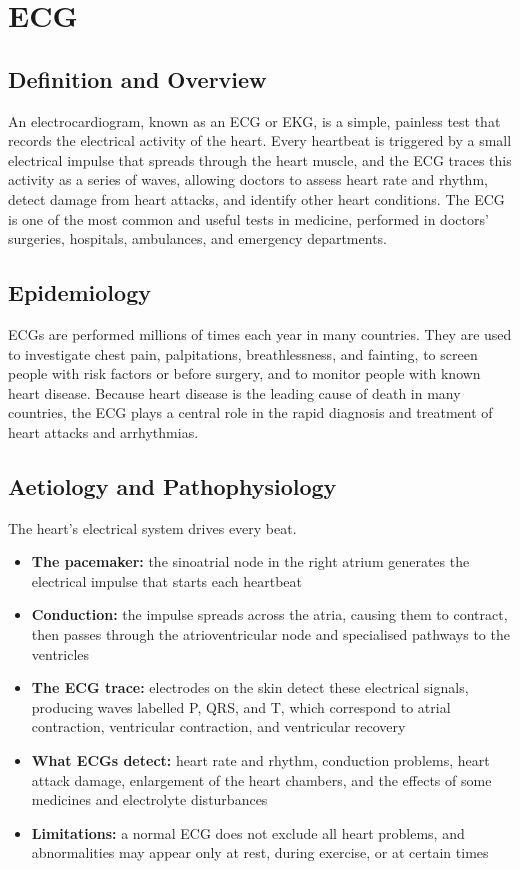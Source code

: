 \chapter{ECG}

\section*{Definition and Overview}
An electrocardiogram, known as an ECG or EKG, is a simple, painless test that records the electrical activity of the heart. Every heartbeat is triggered by a small electrical impulse that spreads through the heart muscle, and the ECG traces this activity as a series of waves, allowing doctors to assess heart rate and rhythm, detect damage from heart attacks, and identify other heart conditions. The ECG is one of the most common and useful tests in medicine, performed in doctors' surgeries, hospitals, ambulances, and emergency departments.

\section*{Epidemiology}
ECGs are performed millions of times each year in many countries. They are used to investigate chest pain, palpitations, breathlessness, and fainting, to screen people with risk factors or before surgery, and to monitor people with known heart disease. Because heart disease is the leading cause of death in many countries, the ECG plays a central role in the rapid diagnosis and treatment of heart attacks and arrhythmias.

\section*{Aetiology and Pathophysiology}
The heart's electrical system drives every beat.
\begin{itemize}
    \item \textbf{The pacemaker:} the sinoatrial node in the right atrium generates the electrical impulse that starts each heartbeat
    \item \textbf{Conduction:} the impulse spreads across the atria, causing them to contract, then passes through the atrioventricular node and specialised pathways to the ventricles
    \item \textbf{The ECG trace:} electrodes on the skin detect these electrical signals, producing waves labelled P, QRS, and T, which correspond to atrial contraction, ventricular contraction, and ventricular recovery
    \item \textbf{What ECGs detect:} heart rate and rhythm, conduction problems, heart attack damage, enlargement of the heart chambers, and the effects of some medicines and electrolyte disturbances
    \item \textbf{Limitations:} a normal ECG does not exclude all heart problems, and abnormalities may appear only at rest, during exercise, or at certain times
\end{itemize}

